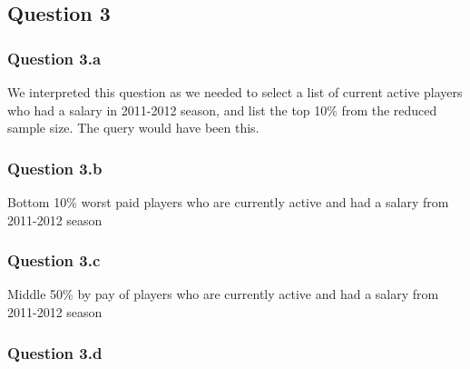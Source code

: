 
\subsection{Question 3}
\label{subsec:413}

\subsubsection{Question 3.a}
\label{subsubsec:413a}
We interpreted this question as we needed to select a list of current active players who had a salary in 2011-2012 season, and list the top 10\% from the reduced sample size. The query would have been this.

\subsubsection{Question 3.b}
\label{subsubsec:413b}
Bottom 10\% worst paid players who are currently active and had a salary from 2011-2012 season

\subsubsection{Question 3.c}
\label{subsubsec:413c}
Middle 50\% by pay of players who are currently active and had a salary from 2011-2012 season

\subsubsection{Question 3.d}
\label{subsubsec:413d}
